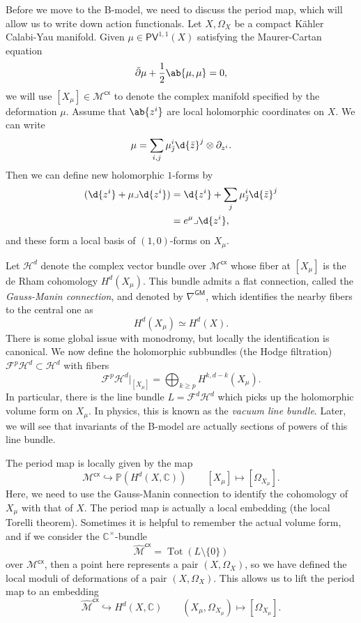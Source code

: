 \documentclass{amsart}
\theoremstyle{definition}
\theoremstyle{remark}
\theoremstyle{plain}
\theoremstyle{definition}
\theoremstyle{remark}
\newcommand{\C}{\mathbb{C}}
\renewcommand{\P}{\mathbb{P}}
\newcommand{\mc}[1]{\mathcal{#1}}
\newcommand{\on}[1]{\operatorname{#1}}
\newcommand{\ms}[1]{\mathsf{#1}}
\newcommand{\1}{\mathbf{1}}
\newcommand{\2}{\mathbf{2}}
\newcommand{\3}{\mathbf{3}}
\newcommand{\dbar}{\bar{\partial}}
\begin{document}
Before we move to the B-model, we need to discuss the period map, which will allow us to write down action functionals. Let \(X, \Omega_X\) be a compact Kähler Calabi-Yau manifold. Given \(\mu \in \ms{PV}^{1,1}(X)\) satisfying the Maurer-Cartan equation
\[ \dbar \mu + \frac{1}{2} \ab\{\mu, \mu\} = 0, \]
we will use \([X_{\mu}] \in \mc{M}^{\ms{cx}}\) to denote the complex manifold specified by the deformation \(\mu\). Assume that \(\ab\{z^i\}\) are local holomorphic coordinates on \(X\). We can write
\[ \mu = \sum_{i,j} \mu_{\bar{\jmath}}^i \d{\bar{z}}^j \otimes \partial_{z^i}. \]
Then we can define new holomorphic \(1\)-forms by
\begin{align*}
    (\d{z^i} + \mu \lrcorner \d{z^i}) &= \d{z^i} + \sum_j \mu_{\bar{\jmath}}^i \d{\bar{z}}^j \\
    &= e^{\mu} \lrcorner \d{z^i},
\end{align*}
and these form a local basis of \((1,0)\)-forms on \(X_{\mu}\). 

Let \(\mc{H}^d\) denote the complex vector bundle over \(\mc{M}^{\ms{cx}}\) whose fiber at \([X_{\mu}]\) is the de Rham cohomology \(H^d(X_{\mu})\). This bundle admits a flat connection, called the \textit{Gauss-Manin connection}, and denoted by \(\nabla^{\ms{GM}}\), which identifies the nearby fibers to the central one as
\[ H^d (X_{\mu}) \simeq H^d(X). \]
There is some global issue with monodromy, but locally the identification is canonical. We now define the holomorphic subbundles (the Hodge filtration)
\(\mc{F}^p \mc{H}^d \subset \mc{H}^d\) with fibers
\[ \mc{F}^p \mc{H}^d|_{[X_{\mu}]} = \bigoplus_{k \geq p} H^{k, d-k}(X_{\mu}). \]
In particular, there is the line bundle \(L = \mc{F}^d \mc{H}^d\) which picks up the holomorphic volume form on \(X_{\mu}\). In physics, this is known as the \textit{vacuum line bundle}. Later, we will see that invariants of the B-model are actually sections of powers of this line bundle.

The period map is locally given by the map
\[ \mc{M}^{\ms{cx}} \hookrightarrow \P (H^d (X, \C)) \qquad [X_{\mu}] \mapsto [\Omega_{X_{\mu}}]. \]
Here, we need to use the Gauss-Manin connection to identify the cohomology of \(X_{\mu}\) with that of \(X\). The period map is actually a local embedding (the local Torelli theorem). Sometimes it is helpful to remember the actual volume form, and if we consider the \(\C^{\times}\)-bundle 
\[ \hat{\mc{M}}^{\ms{cx}} = \on{Tot}(L \setminus \{0\}) \]
over \(\mc{M}^{\ms{cx}}\), then a point here represents a pair \((X, \Omega_X)\), so we have defined the local moduli of deformations of a pair \((X, \Omega_X)\). This allows us to lift the period map to an embedding
\[ \hat{\mc{M}}^{\ms{cx}} \hookrightarrow H^d(X, \C) \qquad (X_{\mu}, \Omega_{X_{\mu}}) \mapsto [\Omega_{X_{\mu}}]. \]
\end{document}
